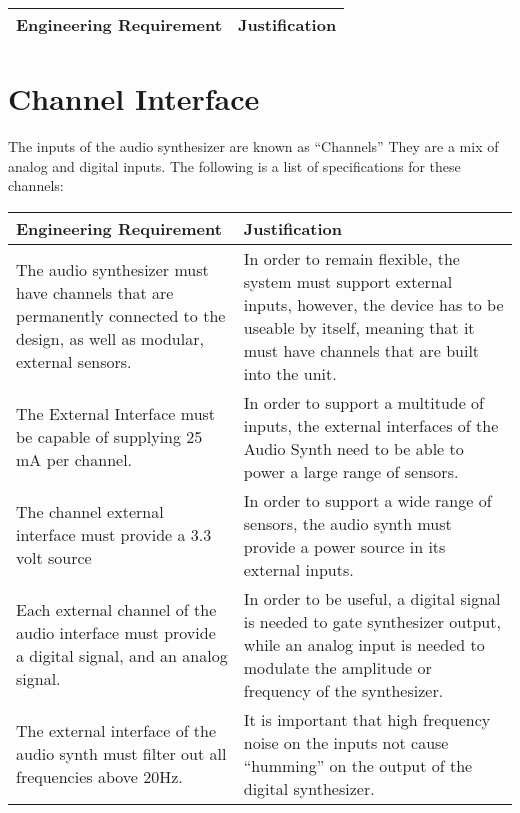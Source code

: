 \documentclass{article}
\begin{document}
\begin{tabular}{|p{3in}|p{3in}|}
\hline
Engineering Requirement & Justification \\
\hline
\end{tabular}


\section{Channel Interface}

The inputs of the audio synthesizer are known as ``Channels'' They are
a mix of analog and digital inputs. The following is a list of
specifications for these channels:

\vspace {.3in}

\begin{tabular}{|p{3in}|p{3in}|}
\hline
Engineering Requirement & Justification \\
\hline

The audio synthesizer must have channels that are permanently
connected to the design, as well as modular, external sensors. & In
order to remain flexible, the system must support external inputs,
however, the device has to be useable by itself, meaning that it must
have channels that are built into the unit. \\

\hline

The External Interface must be capable of supplying 25 mA per channel.
& In order to support a multitude of inputs, the external interfaces
of the Audio Synth need to be able to power a large range of sensors.\\

\hline

The channel external interface must provide a 3.3 volt source & In
order to support a wide range of sensors, the audio synth must provide
a power source in its external inputs. \\

\hline

Each external channel of the audio interface must provide a digital
signal, and an analog signal. & In order to be useful, a digital
signal is needed to gate synthesizer output, while an analog input is
needed to modulate the amplitude or frequency of the synthesizer.\\

\hline 

The external interface of the audio synth must filter out all
frequencies above 20Hz. & It is important that high frequency noise on
the inputs not cause ``humming'' on the output of the digital
synthesizer.\\

\hline

\end{tabular}
\end{document}
